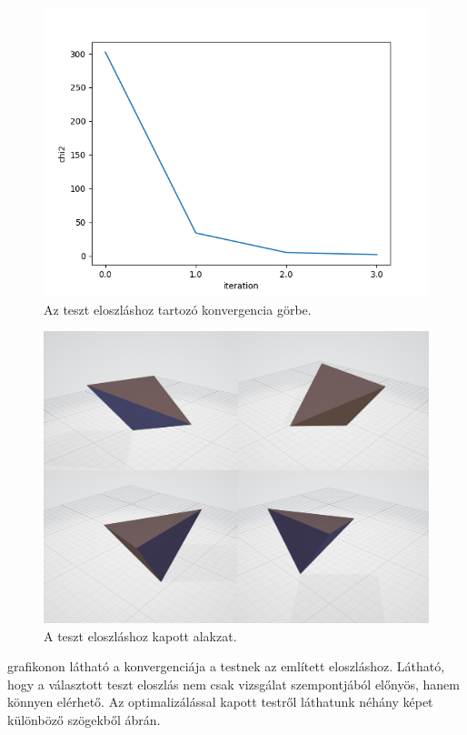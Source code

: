 \begin{figure}[h!]
	\centering
	\includegraphics[scale=0.7]{images/tetrahedron_01.png}
	\caption{Az teszt eloszláshoz tartozó konvergencia görbe.}
	\label{fig:tetra01}
\end{figure}

\begin{figure}[h!]
	\centering
	\includegraphics[width=\textwidth]{images/tetra01obj.png}
	\caption{A teszt eloszláshoz kapott alakzat.}
	\label{fig:tetra01obj}
\end{figure}

 grafikonon látható a konvergenciája a testnek az említett eloszláshoz.
Látható, hogy a választott teszt eloszlás nem csak vizsgálat szempontjából előnyös, hanem könnyen elérhető.
Az optimalizálással kapott testről láthatunk néhány képet különböző szögekből  ábrán.

